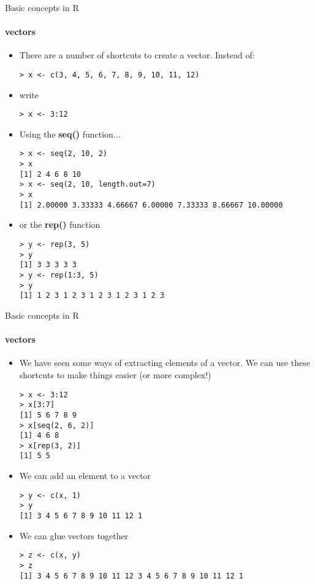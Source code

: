 \documentclass{beamer}
\begin{document}
\begin{frame}{Basic concepts in R}
    \framesubtitle{vectors}
    \begin{itemize}
        \item There are a number of shortcuts to create a vector. Instead of:
        \begin{verbatim}
> x <- c(3, 4, 5, 6, 7, 8, 9, 10, 11, 12)\end{verbatim}
        \item write
        \begin{verbatim}
> x <- 3:12\end{verbatim}
        \item Using the \textbf{seq()} function...
        \begin{verbatim}
> x <- seq(2, 10, 2)
> x
[1] 2 4 6 8 10
> x <- seq(2, 10, length.out=7)
> x
[1] 2.00000 3.33333 4.66667 6.00000 7.33333 8.66667 10.00000\end{verbatim}
        \item or the \textbf{rep()} function
        \begin{verbatim}
> y <- rep(3, 5)
> y
[1] 3 3 3 3 3
> y <- rep(1:3, 5)
> y
[1] 1 2 3 1 2 3 1 2 3 1 2 3 1 2 3\end{verbatim}
    \end{itemize}
\end{frame}

\begin{frame}{Basic concepts in R}
    \framesubtitle{vectors}
    \begin{itemize}
        \item We have seen some ways of extracting elements of a vector. We can use these shortcuts to make things easier (or more complex!)
        \begin{verbatim}
> x <- 3:12
> x[3:7]
[1] 5 6 7 8 9
> x[seq(2, 6, 2)]
[1] 4 6 8 
> x[rep(3, 2)]
[1] 5 5\end{verbatim}
        \item We can add an element to a vector
        \begin{verbatim}
> y <- c(x, 1)
> y
[1] 3 4 5 6 7 8 9 10 11 12 1\end{verbatim}
        \item We can glue vectors together
        \begin{verbatim}
> z <- c(x, y)
> z
[1] 3 4 5 6 7 8 9 10 11 12 3 4 5 6 7 8 9 10 11 12 1\end{verbatim}
    \end{itemize}
\end{frame}
\end{document}
